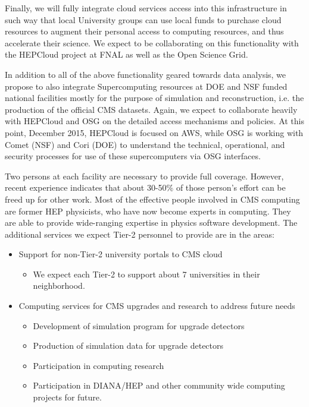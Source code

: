 \documentclass[11pt,a4paper]{article}
\begin{document}
Finally, we will fully integrate cloud services access into this
infrastructure in such way that local University groups can use local
funds to purchase cloud resources to augment their personal access to
computing resources, and thus accelerate their science. We expect to
be collaborating on this functionality with the HEPCloud project at
FNAL as well as the Open Science Grid.

In addition to all of the above functionality geared towards data
analysis, we propose to also integrate Supercomputing resources at DOE
and NSF funded national facilities mostly for the purpose of
simulation and reconstruction, i.e. the production of the official CMS
datasets.  Again, we expect to collaborate heavily with HEPCloud and
OSG on the detailed access mechanisms and policies.  At this point,
December 2015, HEPCloud is focused on AWS, while OSG is working with
Comet (NSF) and Cori (DOE) to understand the technical, operational,
and security processes for use of these supercomputers via OSG
interfaces.


Two persons at each facility are necessary to provide full coverage.
However, recent experience indicates that about 30-50\% of those
person's effort can be freed up for other work. Most of the effective
people involved in CMS computing are former HEP physicists, who have
now become experts in computing. They are able to provide wide-ranging
expertise in physics software development.  The additional services we
expect Tier-2 personnel to provide are in the areas:
\begin{itemize}
\item Support for non-Tier-2 university portals to CMS cloud
\begin{itemize}
\item We expect each Tier-2 to support about 7 universities in their neighborhood.
\end{itemize}
\item Computing services for CMS upgrades and research to address future needs
\begin{itemize}
\item Development of simulation program for upgrade detectors
\item Production of simulation data for upgrade detectors
\item Participation in computing research
\item Participation in DIANA/HEP and other community wide computing projects for future.
\end{itemize}
\end{itemize} 
\end{document}
